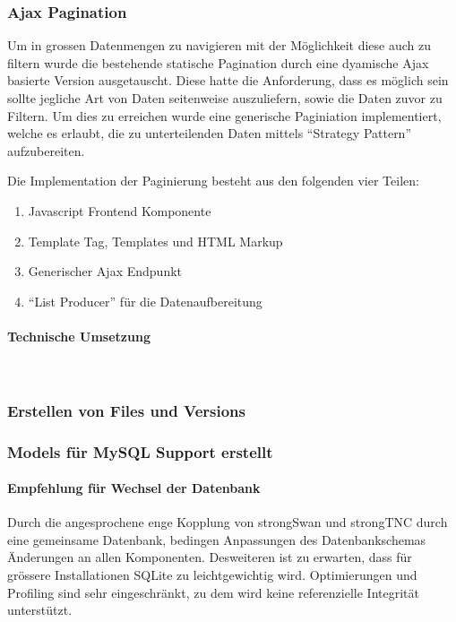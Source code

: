 \subsubsection{Ajax Pagination}
Um in grossen Datenmengen zu navigieren mit der Möglichkeit diese auch zu
filtern wurde die bestehende statische Pagination durch eine dyamische Ajax
basierte Version ausgetauscht. Diese hatte die Anforderung, dass es möglich sein
sollte jegliche Art von Daten seitenweise auszuliefern, sowie die Daten zuvor zu
Filtern. Um dies zu erreichen wurde eine generische Paginiation implementiert,
welche es erlaubt, die zu unterteilenden Daten mittels \enquote{Strategy
Pattern}\cite{gamma1994design} aufzubereiten.

Die Implementation der Paginierung besteht aus den folgenden vier Teilen:
\begin{enumerate}
	\item Javascript Frontend Komponente
	\item Template Tag, Templates und HTML Markup
	\item Generischer Ajax Endpunkt
	\item \enquote{List Producer} für die Datenaufbereitung
\end{enumerate}



\paragraph{Technische Umsetzung} \hspace{0pt} \\


\subsubsection{Erstellen von Files und Versions}

\subsubsection{Models für MySQL Support erstellt}
\paragraph{Empfehlung für Wechsel der Datenbank}
Durch die angesprochene enge Kopplung von strongSwan und strongTNC durch eine gemeinsame Datenbank, bedingen Anpassungen des Datenbankschemas Änderungen an allen Komponenten.
Desweiteren ist zu erwarten, dass für grössere Installationen SQLite zu leichtgewichtig wird.
Optimierungen und Profiling sind sehr eingeschränkt, zu dem wird keine referenzielle Integrität unterstützt.
